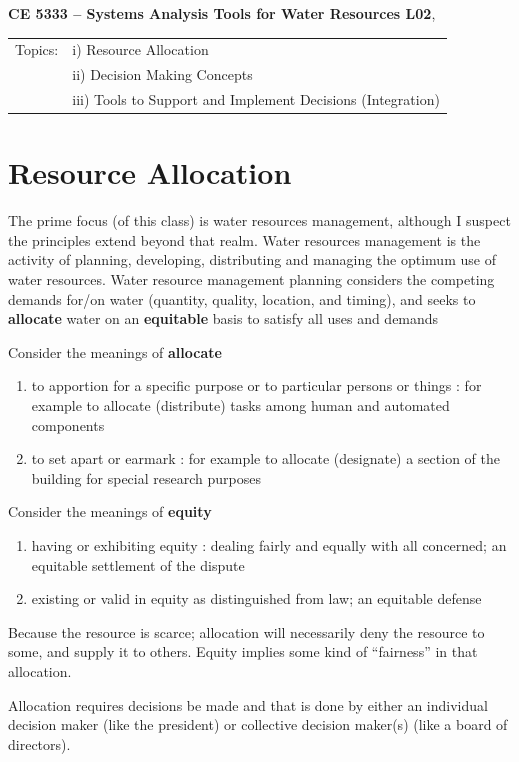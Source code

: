 \documentclass[11pt]{article}
\begin{document}
\begin{center}
{\textbf{{ CE 5333 -- Systems Analysis Tools for Water Resources}  {L02}}},
\end{center}
\begingroup
\begin{tabular}{p{1in} p{5in}}
Topics: & i) Resource Allocation\\
~ & ii) Decision Making Concepts \\
~ & iii) Tools to Support and Implement Decisions (Integration)\\
\end{tabular}
\endgroup
\section{Resource Allocation}
The prime focus (of this class) is water resources management, although I suspect the principles extend beyond that realm.
Water resources management is the activity of planning, developing, distributing and managing the optimum use of water resources. 
Water resource management planning considers the competing demands for/on water (quantity, quality, location, and timing), 
and seeks to \textbf{allocate} water on an \textbf{equitable} basis to satisfy all uses and demands

Consider the meanings of \textbf{allocate}
\begin{enumerate}[1)]
\item to apportion for a specific purpose or to particular persons or things : for example to 
allocate (distribute) tasks among human and automated components
\item to set apart or earmark :  for example to allocate (designate) a section of the building for special
research purposes
\end{enumerate}

Consider the meanings of  \textbf{equity}
\begin{enumerate}[1)]
\item having or exhibiting equity : dealing fairly and equally with all concerned; an
equitable settlement of the dispute
\item existing or valid in equity as distinguished from law; an equitable defense
\end{enumerate}

Because the resource is scarce; allocation will necessarily deny the resource to some, and supply it to others.
Equity implies some kind of ``fairness'' in that allocation.

Allocation requires decisions be made and that is done by either an individual decision maker (like the president) or collective decision maker(s) (like a board of directors).
\end{document}
